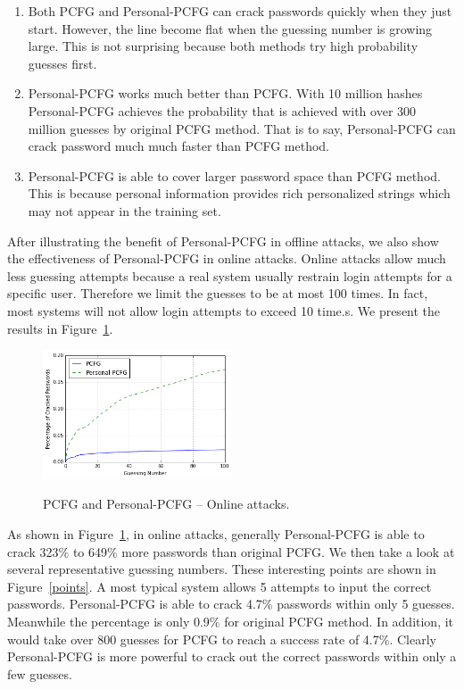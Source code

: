 \begin{enumerate}[leftmargin=*]
\item Both PCFG and Personal-PCFG can crack passwords quickly when they just start. However, the line become flat when the guessing number is growing large. This is not surprising because both methods try high probability guesses first. 

\item Personal-PCFG works much better than PCFG. With 10 million hashes Personal-PCFG achieves the probability that is achieved with over 300 million guesses by original PCFG method. That is to say, Personal-PCFG can crack password much much faster than PCFG method. 

\item Personal-PCFG is able to cover larger password space than PCFG method. This is because personal information provides rich personalized strings which may not appear in the training set.

\end{enumerate}

After illustrating the benefit of Personal-PCFG in offline attacks, we also show the effectiveness of Personal-PCFG in online attacks. Online attacks allow much less guessing attempts because a real system usually restrain login attempts for a specific user. Therefore we limit the guesses to be at most 100 times. In fact, most systems will not allow login attempts to exceed 10 time.s. We present the results in Figure~\ref{cmp100}.

\begin{figure}[h!]
\centering
  \caption{PCFG and Personal-PCFG -- Online attacks.}{}
  \label{cmp100}
  \centering
    \includegraphics[width=0.5\textwidth]{fig/cmp100}
\end{figure}

As shown in Figure~\ref{cmp100}, in online attacks, generally Personal-PCFG is able to crack 323\% to 649\% more passwords than original PCFG. We then take a look at several representative guessing numbers. These interesting points are shown in Figure~\ref{points}. A most typical system allows 5 attempts to input the correct passwords. Personal-PCFG is able to crack 4.7\% passwords within only 5 guesses. Meanwhile the percentage is only 0.9\% for original PCFG method. In addition, it would take over 800 guesses for PCFG to reach a success rate of 4.7\%. Clearly Personal-PCFG is more powerful to crack out the correct passwords within only a few guesses. 

